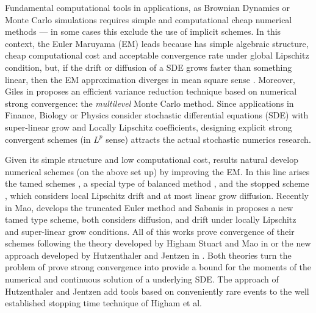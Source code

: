 	Fundamental computational tools in applications,  as Brownian Dynamics \cite{Cruz2012} or Monte Carlo simulations 
\cite{Glasserman2004} requires simple and computational cheap numerical methods  --- 
in some cases this exclude the use of implicit schemes.
In this context, the Euler Maruyama (EM) leads because has simple algebraic structure, 
cheap computational cost and acceptable convergence rate under global Lipschitz condition, but, if the drift or 
diffusion of a SDE grows faster than something linear, then the EM approximation diverges  in mean square sense 
\cite{Hutzenthaler2009, Hutzenthaler2010, Hutzenthaler2012b}.
Moreover, Giles in \cite{Giles2008} proposes an efficient variance reduction technique based on numerical strong 
convergence: the \emph{multilevel}  Monte Carlo method. 
Since applications in Finance, Biology or Physics consider stochastic differential equations (SDE) with super-linear
grow and Locally Lipschitz coefficients, designing explicit strong convergent schemes (in $L^p$ sense)
attracts the actual stochastic numerics research. 

	Given its simple structure and low computational cost, results natural develop numerical schemes (on the
above set up) by improving the EM. In this line arises the tamed schemes
\cite{Hutzenthaler2012c, Hutzenthaler2015, Wang2011, Sabanis2013, Zong2014}, a special type of balanced method 
\cite{Tretyakov2013b}, and the stopped scheme \cite{Liu2013a}, which considers local Lipschitz drift and at most linear 
grow diffusion. Recently in \cite{Mao2015} Mao, develops the truncated Euler method and  Sabanis in \cite{Sabanis2015} 
proposes a new tamed type scheme, both considers diffusion, and drift under locally Lipschitz and super-linear grow 
conditions. All of this works  prove  convergence  of their schemes following the theory developed by Higham Stuart and 
Mao in \cite{Higham2002b} or the new approach developed by  Hutzenthaler and Jentzen in \cite{Hutzenthaler2015}.
Both theories turn the problem of prove strong convergence into provide a bound for the moments of the numerical and 
continuous solution of a underlying SDE. The approach of Hutzenthaler and Jentzen add tools based on conveniently 
rare events to the well established stopping time technique of Higham et al.

